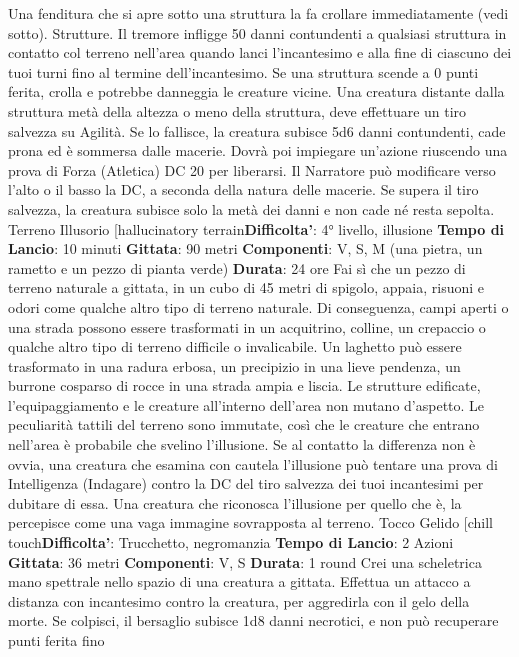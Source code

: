 \begin{multicols}{2}
Una fenditura che si apre sotto una struttura la fa
crollare immediatamente (vedi sotto).
Strutture. Il tremore infligge 50 danni contundenti a
qualsiasi struttura in contatto col terreno nell’area
quando lanci l’incantesimo e alla fine di ciascuno dei
tuoi turni fino al termine dell’incantesimo. Se una
struttura scende a 0 punti ferita, crolla e potrebbe
danneggia le creature vicine. Una creatura distante
dalla struttura metà della altezza o meno della struttura,
deve effettuare un tiro salvezza su Agilità. Se lo
fallisce, la creatura subisce 5d6 danni contundenti,
cade prona ed è sommersa dalle macerie. Dovrà poi
impiegare un’azione riuscendo una prova di Forza
(Atletica) DC 20 per liberarsi. Il Narratore può modificare
verso l’alto o il basso la DC, a seconda della natura
delle macerie. Se supera il tiro salvezza, la creatura
subisce solo la metà dei danni e non cade né resta
sepolta.
Terreno Illusorio
[hallucinatory terrain\textbf{Difficolta'}:
4° livello, illusione
\textbf{Tempo di Lancio}: 10 minuti
\textbf{Gittata}: 90 metri
\textbf{Componenti}: V, S, M (una pietra, un rametto e un
pezzo di pianta verde)
\textbf{Durata}: 24 ore
Fai sì che un pezzo di terreno naturale a gittata, in un
cubo di 45 metri di spigolo, appaia, risuoni e odori come
qualche altro tipo di terreno naturale. Di conseguenza,
campi aperti o una strada possono essere trasformati in
un acquitrino, colline, un crepaccio o qualche altro tipo
di terreno difficile o invalicabile. Un laghetto può essere
trasformato in una radura erbosa, un precipizio in una
lieve pendenza, un burrone cosparso di rocce in una
strada ampia e liscia. Le strutture edificate,
l’equipaggiamento e le creature all’interno dell’area non
mutano d’aspetto.
Le peculiarità tattili del terreno sono immutate, così che
le creature che entrano nell’area è probabile che
svelino l’illusione. Se al contatto la differenza non è
ovvia, una creatura che esamina con cautela l’illusione
può tentare una prova di Intelligenza (Indagare) contro
la DC del tiro salvezza dei tuoi incantesimi per dubitare
di essa. Una creatura che riconosca l’illusione per
quello che è, la percepisce come una vaga immagine
sovrapposta al terreno.
Tocco Gelido
[chill touch\textbf{Difficolta'}:
Trucchetto, negromanzia
\textbf{Tempo di Lancio}: 2 Azioni
\textbf{Gittata}: 36 metri
\textbf{Componenti}: V, S
\textbf{Durata}: 1 round
Crei una scheletrica mano spettrale nello spazio di una
creatura a gittata. Effettua un attacco a distanza con
incantesimo contro la creatura, per aggredirla con il
gelo della morte. Se colpisci, il bersaglio subisce 1d8
danni necrotici, e non può recuperare punti ferita fino

\end{multicols}
